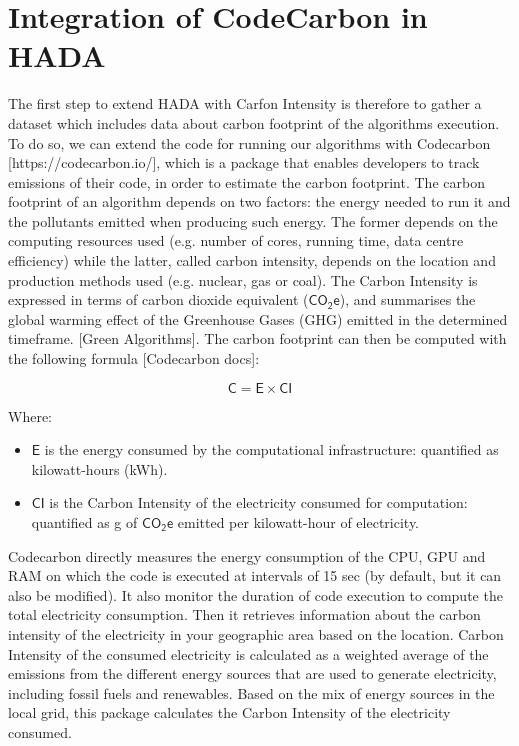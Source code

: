 \documentclass[a4paper,singleside,12pt]{report} %
\begin{document}
\section{Integration of CodeCarbon in HADA}

The first step to extend HADA with Carfon Intensity is therefore to gather a dataset which includes data about carbon footprint 
of the algorithms execution. To do so, we can extend the code for running our algorithms with Codecarbon [https://codecarbon.io/], 
which is a package that enables developers to track emissions of their code, in order to estimate the carbon footprint. 
The carbon footprint of an algorithm depends on two factors: the energy needed to run it and the pollutants emitted when producing 
such energy. The former depends on the computing resources used (e.g. number of cores, running time, data centre efficiency) 
while the latter, called carbon intensity, depends on the location and production methods used (e.g. nuclear, gas or coal). 
The Carbon Intensity is expressed in terms of carbon dioxide equivalent ($\mathsf{CO_2e}$), and summarises the global warming 
effect of the Greenhouse Gases (GHG) emitted in the determined timeframe. [Green Algorithms]. The carbon footprint can then 
be computed with the following formula [Codecarbon docs]:

\begin{equation}
    \mathsf{C} = \mathsf{E} \times \mathsf{CI}
\end{equation}

Where:

\begin{itemize}
    \item $\mathsf{E}$ is the energy consumed by the computational infrastructure: quantified as kilowatt-hours (kWh).
    \item $\mathsf{CI}$ is the Carbon Intensity of the electricity consumed for computation: quantified as g of \(\mathsf{CO_2e}\) 
    emitted per kilowatt-hour of electricity.
\end{itemize}

Codecarbon directly measures the energy consumption of the CPU, GPU and RAM on which the code is executed at intervals of 15 sec 
(by default, but it can also be modified). It also monitor the duration of code execution to compute the total electricity 
consumption. Then it retrieves information about the carbon intensity of the electricity in your geographic area based on the 
location. Carbon Intensity of the consumed electricity is calculated as a weighted average of the emissions from the different
energy sources that are used to generate electricity, including fossil fuels and renewables. Based on the mix of energy sources 
in the local grid, this package calculates the Carbon Intensity of the electricity consumed.
\end{document}
